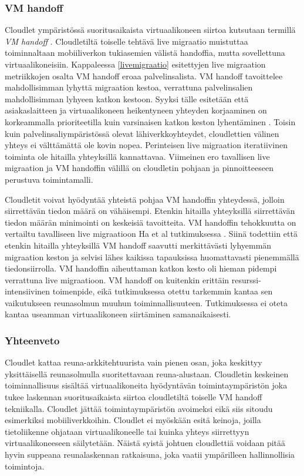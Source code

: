 \subsubsection*{VM handoff} \label{vmhandoff}

Cloudlet ympäristössä suoritusaikaista virtuaalikoneen siirtoa kutsutaan termillä \textit{VM handoff} \cite{ha2015adaptive}. Cloudletiltä toiselle tehtävä live migraatio muistuttaa toiminnaltaan mobiiliverkon tukiasemien välistä handoffia, mutta sovellettuna virtuaalikoneisiin.
Kappaleessa \ref{livemigraatio} esitettyjen live migraation metriikkojen osalta VM handoff eroaa palvelinsalista. VM handoff tavoittelee mahdollisimman lyhyttä migraation kestoa, verrattuna palvelinsalien mahdollisimman lyhyeen katkon kestoon.
Syyksi tälle esitetään että asiakaslaitteen ja virtuaalikoneen heikentyneen yhteyden korjaaminen on korkeammalla prioriteetilla kuin varsinaisen katkon keston lyhentäminen \cite{ha2015adaptive}.
Toisin kuin palvelinsaliympäristössä olevat lähiverkkoyhteydet, cloudlettien välinen yhteys ei välttämättä ole kovin nopea. 
Perinteisen live migraation iteratiivinen toiminta ole hitailla yhteyksillä kannattavaa. 
Viimeinen ero tavallisen live migraation ja VM handoffin välillä on cloudletin pohjaan ja pinnoitteeseen perustuva toimintamalli.

Cloudletit voivat hyödyntää yhteistä pohjaa VM handoffin yhteydessä, jolloin siirrettävän tiedon määrä on vähäisempi. 
Etenkin hitailla yhteyksillä siirrettävän tiedon määrän minimointi on keskeisiä tavoitteita. 
VM handoffin tehokkuutta on vertailtu tavalliseen live migraatioon Ha et al tutkimuksessa \cite{ha2017you}. Siinä todettiin että etenkin hitailla yhteyksillä VM handoff saavutti merkittävästi lyhyemmän migraation keston ja selvisi lähes kaikissa tapauksissa huomattavasti pienemmällä tiedonsiirrolla. VM handoffin aiheuttaman katkon kesto oli hieman pidempi verrattuna live migraatioon. 
VM handoff on kuitenkin erittäin resurssi-intensiivinen toimenpide, eikä tutkimuksessa otettu tarkemmin kantaa sen vaikutukseen reunasolmun muuhun toiminnallisuuteen.
Tutkimuksessa ei oteta kantaa useamman virtuaalikoneen siirtäminen samanaikaisesti. 
\subsubsection*{Yhteenveto}
Cloudlet kattaa reuna-arkkitehtuurista vain pienen osan, joka keskittyy yksittäisellä reunasolmulla suoritettavaan reuna-alustaan. Cloudletin keskeinen toiminnallisuus sisältää virtuaalikoneita hyödyntävän toimintaympäristön joka tukee laskennan suoritusaikaista siirtoa cloudletiltä toiselle VM handoff tekniikalla. 
Cloudlet jättää toimintaympäristön avoimeksi eikä siis sitoudu esimerkiksi mobiiliverkkoihin.
Cloudlet ei myöskään esitä keinoja, joilla tietoliikenne ohjataan virtuaalikoneelle tai kuinka yhteys siirrettyyn virtuaalikoneeseen säilytetään. 
Näistä syistä johtuen cloudlettiä voidaan pitää hyvin suppeana reunalaskennan ratkaisuna, joka vaatii ympärilleen hallinnollisia toimintoja.
